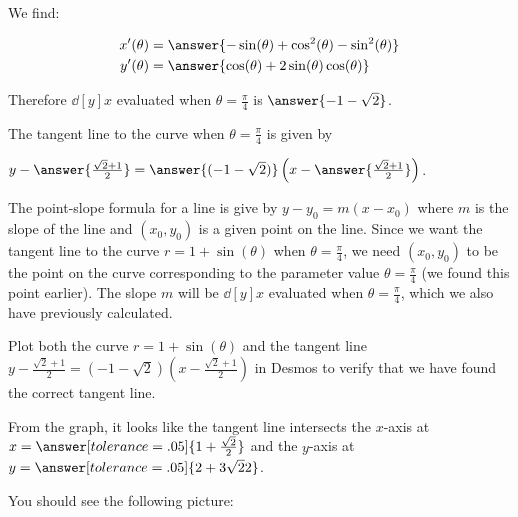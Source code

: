 \documentclass{ximera}
\begin{document}
\begin{exercise}
\begin{exercise}
\begin{hint}
We find:

\begin{align*}
x'(\theta)&=\answer{ -\sin(\theta)+\cos^2(\theta)-\sin^2(\theta)} \\
y'(\theta)&=\answer{ \cos(\theta)+2\sin(\theta)\cos(\theta) }
\end{align*} 

Therefore $\dd[y]{x}$ evaluated when $\theta=\frac{\pi}{4}$ is $\answer{ -1-\sqrt{2}   }$.


\end{hint}

\begin{exercise}

The tangent line to the curve when $\theta=\frac{\pi}{4}$ is given by 

$y-\answer{\frac{\sqrt{2}+1}{2}   }=\answer{ ( -1-\sqrt{2} )  }\left( x- \answer{  \frac{\sqrt{2}+1}{2} }  \right)$. 

\begin{hint}


The point-slope formula for a line is give by $y-y_{0}=m(x-x_{0})$ where $m$ is the slope of the line and $(x_{0},y_{0})$ is a given point on the line. 
Since we want the tangent line to the curve $r=1+\sin(\theta)$ when $\theta=\frac{\pi}{4}$, we need $(x_{0},y_{0})$ to be the point on the curve corresponding to the parameter value $\theta=\frac{\pi}{4}$ (we found this point earlier). The slope $m$ will be $\dd[y]{x}$ evaluated when $\theta=\frac{\pi}{4}$, which we also have previously calculated. 

\end{hint}

\begin{exercise}
Plot both the curve $r= 1 + \sin(\theta)$ and the tangent line $y-\frac{\sqrt{2}+1}{2}   = ( -1-\sqrt{2} )  \left( x-  \frac{\sqrt{2}+1}{2}   \right)$ in Desmos to verify that we have found the correct tangent line.  

From the graph, it looks like the tangent line intersects the $x$-axis at $x=\answer[tolerance=.05]{ 1+ \frac{\sqrt{2}}{2} }$ and the $y$-axis at $y=\answer[tolerance=.05]{2+3\sqrt{2}{2}}$.

\begin{hint}
You should see the following picture:


\end{hint}
\end{exercise}
\end{exercise}
\end{exercise}
\end{exercise}
\end{document}

